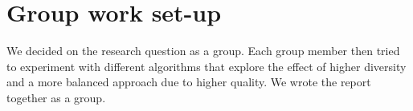 \section{Group work set-up}

We decided on the research question as a group. Each group member then tried to experiment with different algorithms that explore the effect of higher diversity and a more balanced approach due to higher quality. We wrote the report together as a group.

